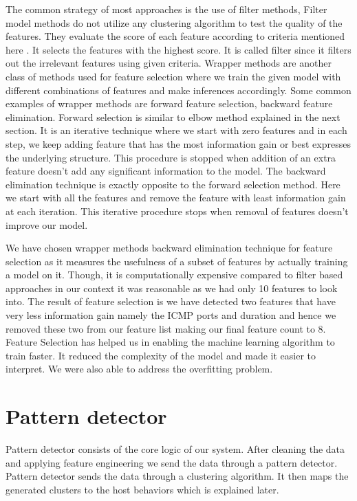 	The common strategy of most approaches is the use of filter methods, Filter model methods do not utilize any clustering algorithm to test the quality of the features. They evaluate the score of each feature according to criteria mentioned here \cite{dash2002feature}. It selects the features with the highest score. It is called filter since it filters out the irrelevant features using given criteria. 
	Wrapper methods are another class of methods used for feature selection where we train the given model with different combinations of features and make inferences accordingly.
	Some common examples of wrapper methods are forward feature selection, backward feature elimination. Forward selection is similar to elbow method explained in the next section. It is an iterative technique where we start with zero features and in each step, we keep adding feature that has the most information gain or best expresses the underlying structure. This procedure is stopped when addition of an extra feature doesn't add any significant information to the model. The backward elimination technique is exactly opposite to the forward selection method. Here we start with all the features and remove the feature with least information gain at each iteration. This iterative procedure stops when removal of features doesn't improve our model.
	
	We have chosen wrapper methods backward elimination technique for feature selection as it measures the usefulness of a subset of features by actually training a model on it. Though, it is computationally expensive compared to filter based approaches in our context it was reasonable as we had only 10 features to look into. The result of feature selection is we have detected two features that have very less information gain namely the ICMP ports and duration and hence we removed these two from our feature list making our final feature count to 8.
	 Feature Selection has helped us in enabling the machine learning algorithm to train faster. It reduced the complexity of the model and made it easier to interpret. We were also able to address the overfitting problem.






\section{Pattern detector}
Pattern detector consists of the core logic of our system. After cleaning the data and applying feature engineering we send the data through a pattern detector. Pattern detector sends the data through a clustering algorithm. It then maps the generated clusters to the host behaviors which is explained later.

